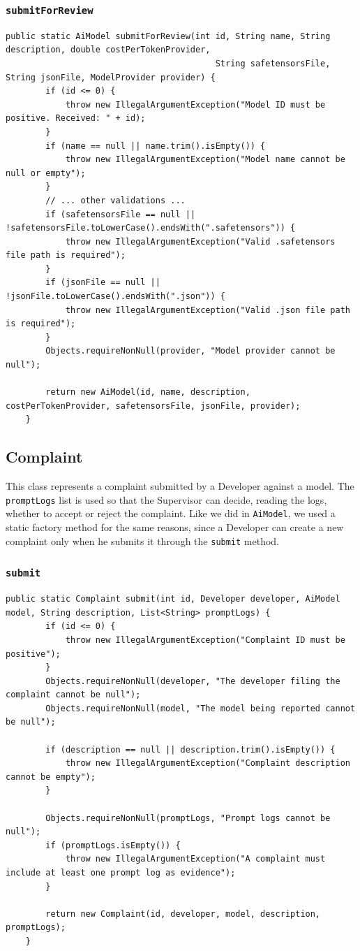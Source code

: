\documentclass[a4paper,11pt]{report}
\begin{document}
	\subsubsection{\texttt{submitForReview}}
	\begin{lstlisting}[label={lst:aimodelsubmit}]
	public static AiModel submitForReview(int id, String name, String description, double costPerTokenProvider,
	                                      String safetensorsFile, String jsonFile, ModelProvider provider) {
		if (id <= 0) {
			throw new IllegalArgumentException("Model ID must be positive. Received: " + id);
		}
		if (name == null || name.trim().isEmpty()) {
			throw new IllegalArgumentException("Model name cannot be null or empty");
		}
		// ... other validations ...
		if (safetensorsFile == null || !safetensorsFile.toLowerCase().endsWith(".safetensors")) {
			throw new IllegalArgumentException("Valid .safetensors file path is required");
		}
		if (jsonFile == null || !jsonFile.toLowerCase().endsWith(".json")) {
			throw new IllegalArgumentException("Valid .json file path is required");
		}
		Objects.requireNonNull(provider, "Model provider cannot be null");
	
		return new AiModel(id, name, description, costPerTokenProvider, safetensorsFile, jsonFile, provider);
	}
	\end{lstlisting}
	\subsection{Complaint}
	This class represents a complaint submitted by a Developer against a model. 
	The \texttt{promptLogs} list is used so that the Supervisor can decide, reading the logs, whether to accept or reject the complaint.
	Like we did in \texttt{AiModel}, we used a static factory method for the same reasons, since a Developer can create a new complaint only when he submits it through the \texttt{submit} method.
	
	\subsubsection{\texttt{submit}}
	\begin{lstlisting}[label={lst:complaintsubmit}]
	public static Complaint submit(int id, Developer developer, AiModel model, String description, List<String> promptLogs) {
		if (id <= 0) {
			throw new IllegalArgumentException("Complaint ID must be positive");
		}
		Objects.requireNonNull(developer, "The developer filing the complaint cannot be null");
		Objects.requireNonNull(model, "The model being reported cannot be null");
	
		if (description == null || description.trim().isEmpty()) {
			throw new IllegalArgumentException("Complaint description cannot be empty");
		}
	
		Objects.requireNonNull(promptLogs, "Prompt logs cannot be null");
		if (promptLogs.isEmpty()) {
			throw new IllegalArgumentException("A complaint must include at least one prompt log as evidence");
		}
	
		return new Complaint(id, developer, model, description, promptLogs);
	}
	\end{lstlisting}
	
\end{document}
